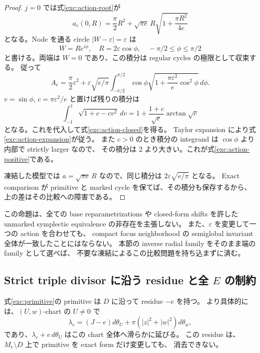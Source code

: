 \begin{proof}
$j=0$ では式\eqref{exc:action-root}が
\[
 a_e(0,R)=\frac\pi2R^2+
   \sqrt{\pi e}\,R\sqrt{1+\frac{\pi R^2}{4e}}
\]
となる。Node を通る circle $|W-\varepsilon|=\varepsilon$ は
\[
 W=R e^{i\phi},\quad R=2\varepsilon\cos\phi,
 \quad-\pi/2\le\phi\le\pi/2
\]
と書ける。両端は $W=0$ であり、この積分は regular cycles の極限として収束する。
従って
\[
 A_e=\frac\pi2\varepsilon^2+
 \varepsilon\sqrt{e/\pi}
 \int_{-\pi/2}^{\pi/2}\cos\phi
   \sqrt{1+\frac{\pi\varepsilon^2}{e}\cos^2\phi}\,d\phi.
\]
$v=\sin\phi$, $c=\pi\varepsilon^2/e$ と置けば残りの積分は
\[
 \int_{-1}^{1}\sqrt{1+c-cv^2}\,dv
       =1+\frac{1+c}{\sqrt c}\arctan\sqrt c
\]
となる。これを代入して式\eqref{exc:action-closed}を得る。
Taylor expansion により式\eqref{exc:action-expansion}が従う。
また $c>0$ のとき積分の integrand は $\cos\phi$ より内部で strictly larger なので、
その積分は $2$ より大きい。これが式\eqref{exc:action-positive}である。

凍結した模型では $a=\sqrt{\pi e}\,R$ なので、同じ積分は
$2\varepsilon\sqrt{e/\pi}$ となる。
Exact comparison が primitive と marked cycle を保てば、その積分も保存するから、
上の差はその比較への障害である。
\end{proof}

この命題は、全ての base reparametrizations や closed-form shifts を許した
unmarked symplectic equivalence の非存在を主張しない。
また、$\varepsilon$ を変更して一つの action を合わせても、
compact focus neighborhood の semiglobal invariant 全体が一致したことにはならない。
本節の inverse radial family をそのまま端の family として選べば、
不要な凍結によるこの比較問題を持ち込まずに済む。

\subsection{Strict triple divisor に沿う residue と全 $E$ の制約}

\begin{proposition}
\label{exc:residue}
式\eqref{exc:primitive}の primitive は $D$ に沿って residue $-e$ を持つ。
より具体的には、$(U,w)$-chart の $U\ne0$ で
\begin{equation}\label{exc:residue-formula}
 \lambda_e=(J-e)d\theta_U+
              \pi(|z|^2+|w|^2)d\theta_w,
\end{equation}
であり、$\lambda_e+e\,d\theta_U$ はこの chart 全体へ滑らかに延びる。
この residue は、$M_e\setminus D$ 上で primitive を exact form だけ変更しても、
消去できない。
\end{proposition}

